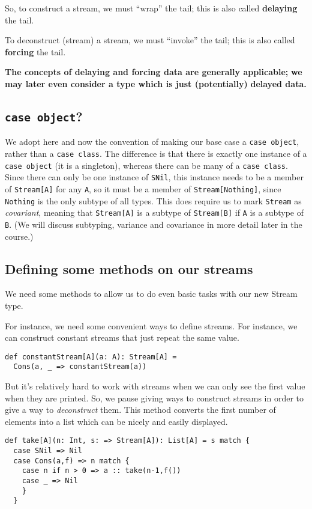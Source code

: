 \documentclass[11pt]{article}
\begin{document}
\begin{center}
So, to construct a stream, we must “wrap” the tail;
this is also called \textbf{delaying} the tail.

To deconstruct (stream) a stream, we must “invoke” the tail;
this is also called \textbf{forcing} the tail.

\textbf{The concepts of delaying and forcing data are generally applicable;}
\textbf{we may later even consider a type which is just (potentially)}
\textbf{delayed data.}
\end{center}

\subsection{\texttt{case object}?}
\label{sec:org24d4b7d}
We adopt here and now the convention of making our base case
a \texttt{case object}, rather than a \texttt{case class}.
The difference is that there is exactly one instance of
a \texttt{case object} (it is a singleton),
whereas there can be many of a \texttt{case class}.
Since there can only be one instance of \texttt{SNil},
this instance needs to be a member of \texttt{Stream[A]} for any \texttt{A},
so it must be a member of \texttt{Stream[Nothing]}, since \texttt{Nothing} is
the only subtype of all types.
This does require us to mark \texttt{Stream} as \emph{covariant},
meaning that \texttt{Stream[A]} is a subtype of \texttt{Stream[B]} if
\texttt{A} is a subtype of \texttt{B}.
(We will discuss subtyping, variance and covariance
in more detail later in the course.)

\subsection{Defining some methods on our streams}
\label{sec:org2ade41c}
We need some methods to allow us to do
even basic tasks with our new Stream type.

For instance, we need some convenient ways
to define streams.
For instance, we can construct constant streams
that just repeat the same value.
\begin{verbatim}
def constantStream[A](a: A): Stream[A] =
  Cons(a, _ => constantStream(a))
\end{verbatim}

But it's relatively hard to work with streams
when we can only see the first value
when they are printed.
So, we pause giving ways to construct streams
in order to give a way to \emph{deconstruct} them.
This method converts the first number of elements
into a list which can be nicely and easily displayed.
\begin{verbatim}
def take[A](n: Int, s: => Stream[A]): List[A] = s match {
  case SNil => Nil
  case Cons(a,f) => n match {
    case n if n > 0 => a :: take(n-1,f())
    case _ => Nil
    }
  }
\end{verbatim}
\end{document}
